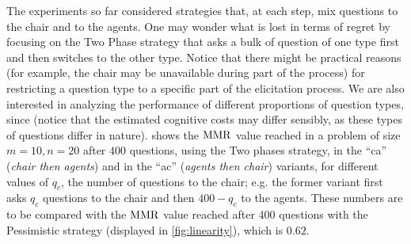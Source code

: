 \documentclass[sigconf, anonymous]{aamas}
\begin{document}

The experiments so far considered strategies that, at each step, mix questions to the chair and to the agents. One may wonder what is lost in terms of regret by focusing on the Two Phase strategy that asks a bulk of question of one type first and then switches to the other type.  %
Notice that there might be practical reasons (for example, the chair may be unavailable during part of the process) for restricting a question type to a specific part of the elicitation process.
We are also interested in analyzing the performance of different proportions of question types, since  (notice that the estimated cognitive costs may differ sensibly, as these types of questions differ in nature).
 shows the $\operatorname{MMR}$ value reached in a problem of size $m = 10, n = 20$ after $400$ questions, using the Two phases strategy, in the “ca” ({\em chair then agents}) and in the “ac” ({\em agents then chair}) variants, for different values of $q_{c}$, the number of questions to the chair; 
e.g. the former variant first asks $q_{c}$ questions to the chair and then $400-q_{c}$ to the agents. %
These numbers are to be compared with the $\operatorname{MMR}$ value reached after 400 questions with the Pessimistic strategy (displayed in \cref{fig:linearity}), which is $0.62$.%
\end{document}
